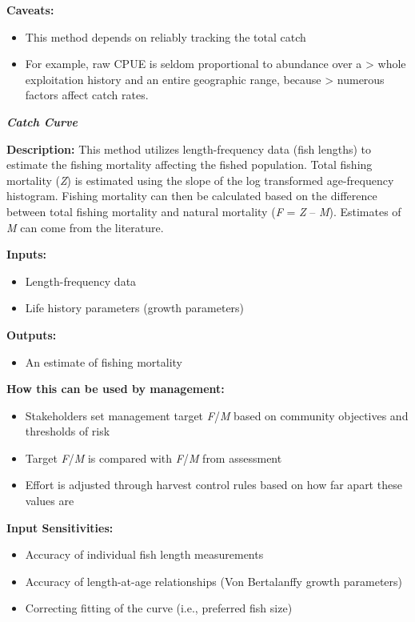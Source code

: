 \documentclass[]{book}
\providecommand{\tightlist}{%
  \setlength{\itemsep}{0pt}\setlength{\parskip}{0pt}}
\begin{document}
\textbf{Caveats:}

\begin{itemize}
\item
  This method depends on reliably tracking the total catch
\item
  For example, raw CPUE is seldom proportional to abundance over a
  \textgreater{} whole exploitation history and an entire geographic
  range, because \textgreater{} numerous factors affect catch rates.
\end{itemize}

\textbf{\emph{Catch Curve}}

\textbf{Description:} This method utilizes length-frequency data (fish
lengths) to estimate the fishing mortality affecting the fished
population. Total fishing mortality (\emph{Z}) is estimated using the
slope of the log transformed age-frequency histogram. Fishing mortality
can then be calculated based on the difference between total fishing
mortality and natural mortality (\emph{F} = \emph{Z} -- \emph{M}).
Estimates of \emph{M} can come from the literature.

\textbf{Inputs:}

\begin{itemize}
\item
  Length-frequency data
\item
  Life history parameters (growth parameters)
\end{itemize}

\textbf{Outputs: }

\begin{itemize}
\tightlist
\item
  An estimate of fishing mortality
\end{itemize}

\textbf{How this can be used by management:}

\begin{itemize}
\item
  Stakeholders set management target \emph{F}/\emph{M} based on
  community objectives and thresholds of risk
\item
  Target \emph{F}/\emph{M} is compared with \emph{F}/\emph{M} from
  assessment
\item
  Effort is adjusted through harvest control rules based on how far
  apart these values are
\end{itemize}

\textbf{Input Sensitivities: }

\begin{itemize}
\item
  Accuracy of individual fish length measurements
\item
  Accuracy of length-at-age relationships (Von Bertalanffy growth
  parameters)
\item
  Correcting fitting of the curve (i.e., preferred fish size)
\end{itemize}
\end{document}
